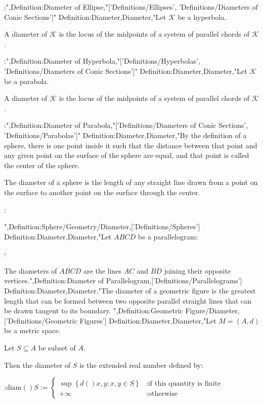 :",Definition:Diameter of Ellipse,"['Definitions/Ellipses', 'Definitions/Diameters of Conic Sections']"
Definition:Diameter,Diameter,"Let $\mathcal K$ be a hyperbola.

A diameter of $\mathcal K$ is the locus of the midpoints of a system of parallel chords of $\mathcal K$.


:",Definition:Diameter of Hyperbola,"['Definitions/Hyperbolas', 'Definitions/Diameters of Conic Sections']"
Definition:Diameter,Diameter,"Let $\mathcal K$ be a parabola.

A diameter of $\mathcal K$ is the locus of the midpoints of a system of parallel chords of $\mathcal K$.


:",Definition:Diameter of Parabola,"['Definitions/Diameters of Conic Sections', 'Definitions/Parabolas']"
Definition:Diameter,Diameter,"By the definition of a sphere, there is one point inside it such that the distance between that point and any given point on the surface of the sphere are equal, and that point is called the center of the sphere.


The diameter of a sphere is the length of any straight line drawn from a point on the surface to another point on the surface through the center.



:

",Definition:Sphere/Geometry/Diameter,['Definitions/Spheres']
Definition:Diameter,Diameter,"Let $ABCD$ be a parallelogram:

:

The diameters of $ABCD$ are the lines $AC$ and $BD$ joining their opposite vertices.",Definition:Diameter of Parallelogram,['Definitions/Parallelograms']
Definition:Diameter,Diameter,"The diameter of a geometric figure is the greatest length that can be formed between two opposite parallel straight lines that can be drawn tangent to its boundary.
",Definition:Geometric Figure/Diameter,['Definitions/Geometric Figures']
Definition:Diameter,Diameter,"Let $M = \left( A, d \right)$ be a metric space.

Let $S \subseteq A$ be subset of $A$.


Then the diameter of $S$ is the extended real number defined by:

:$\mathrm {diam} \left(   \right)S := \begin {cases} \sup \left\lbrace d \left(   \right){x, y}: x, y \in S \right\rbrace & : \text {if this quantity is finite} \\ + \infty & : \text {otherwise} \end {cases}$


